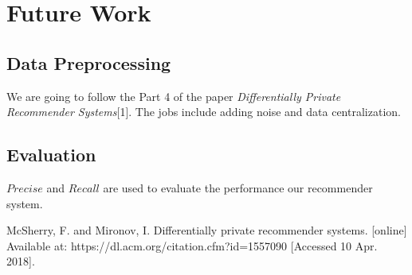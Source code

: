 \documentclass[]{article}
\begin{document}
\section{Future Work}
\subsection{Data Preprocessing}
We are going to follow the Part 4 of the paper \textit{Differentially Private Recommender Systems}[1]. The jobs include adding noise and data centralization.

\subsection{Evaluation}
$Precise$ and $Recall$ are used to evaluate the performance our recommender system.


\begin{thebibliography}
  \bibitem{[1]}McSherry, F. and Mironov, I. Differentially private recommender systems. [online] Available at: https://dl.acm.org/citation.cfm?id=1557090 [Accessed 10 Apr. 2018].
\end{thebibliography}
\end{document}
